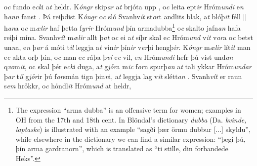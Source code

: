 o\textit{c} fundo e\textit{ck}i  a\textit{t} heldr.
K\textit{óngr} skip\textit{ar}  a\textit{t} 
brjóta upp  ,  
o\textit{c} leita ept\textit{ir} Hróm\textit{undi}
e\textit{n} h\textit{ann} fanst  . 
Þá reiþdist   K\textit{óngr} 
o\textit{c} sló Svanhv\textit{ít}  st\textit{or}t andlits blak, a\textit{t} blóþ\textit{it} féll 
||
  h\textit{an}a o\textit{c} m\textit{ælir} haf þetta f\textit{yrir}
Hróm\textit{und} þín  armadubba\footnote{The expression \enquote{arma dubba} is an offensive term for women; examples in OH from the 17th and 18th cent. In Blöndal's dictionary  \textit{dubba}  (Da. \textit{kvinde, laptaske}) is illustrated with an example  \enquote{sagði þær örmu dubbur [...] skyldu}, while elsewhere in the dictionary we can find a similar expression: \enquote{þegi þú, þín arma gardranorn}, which is translated as \enquote{ti stille, din forbandede Heks}.}
o\textit{c} skalto jafn\textit{an} hafa reiþi mína. Svanhv\textit{ít}
m\textit{ælir} allt  þ\textit{at} o\textit{c} ei a\textit{t} síþr skal e\textit{c}  Hróm\textit{und} v\textit{it} v\textit{ar}a o\textit{c} betst
un\textit{n}a,  e\textit{n} þ\textit{ar} á móti t\textit{il}
leggja a\textit{t} vin\textit{ir} þín\textit{ir}  v\textit{er}þi  hengþ\textit{ir}. K\textit{óngr}
m\textit{ælir} lít\textit{it} man e\textit{c}  akta orþ þín, 
o\textit{c} man e\textit{c} ráþa þ\textit{ví} e\textit{c} vil, 
e\textit{n} Hróm\textit{undi}
hefr þú víst und\textit{an} q\textit{vo}m\textit{it}, oc  skal þér
 e\textit{ck}i duga, 
a\textit{t} g\textit{jỏr}a m\textit{ic}
f\textit{or}n spurþ\textit{an} a\textit{t} tali ykkar
Hróm\textit{undar} þ\textit{ar} t\textit{il} g\textit{jỏr}ir þú
f\textit{or}smán tign þin\textit{n}i, a\textit{t} leggja lag   v\textit{it} slétt\textit{an} . Svanh\textit{vít}   er  raun s\textit{em}  hrỏkkr, o\textit{c} hỏndl\textit{it}  Hróm\textit{und} at heldr, 

